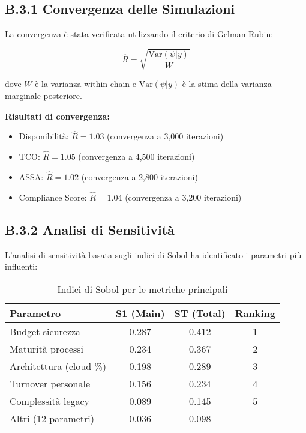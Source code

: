 \subsection{B.3.1 Convergenza delle Simulazioni}

La convergenza è stata verificata utilizzando il criterio di Gelman-Rubin:

\begin{equation}
\hat{R} = \sqrt{\frac{\text{Var}(\psi|y)}{W}}
\end{equation}

dove $W$ è la varianza within-chain e $\text{Var}(\psi|y)$ è la stima della varianza marginale posteriore.

\textbf{Risultati di convergenza:}
\begin{itemize}
    \item Disponibilità: $\hat{R} = 1.03$ (convergenza a 3,000 iterazioni)
    \item TCO: $\hat{R} = 1.05$ (convergenza a 4,500 iterazioni)
    \item ASSA: $\hat{R} = 1.02$ (convergenza a 2,800 iterazioni)
    \item Compliance Score: $\hat{R} = 1.04$ (convergenza a 3,200 iterazioni)
\end{itemize}

\subsection{B.3.2 Analisi di Sensitività}

L'analisi di sensitività basata sugli indici di Sobol ha identificato i parametri più influenti:

\begin{table}[htbp]
\centering
\caption{Indici di Sobol per le metriche principali}
\begin{tabular}{|l|c|c|c|}
\hline
\textbf{Parametro} & \textbf{S1 (Main)} & \textbf{ST (Total)} & \textbf{Ranking} \\
\hline
Budget sicurezza & 0.287 & 0.412 & 1 \\
Maturità processi & 0.234 & 0.367 & 2 \\
Architettura (cloud \%) & 0.198 & 0.289 & 3 \\
Turnover personale & 0.156 & 0.234 & 4 \\
Complessità legacy & 0.089 & 0.145 & 5 \\
Altri (12 parametri) & 0.036 & 0.098 & - \\
\hline
\end{tabular}
\end{table}

